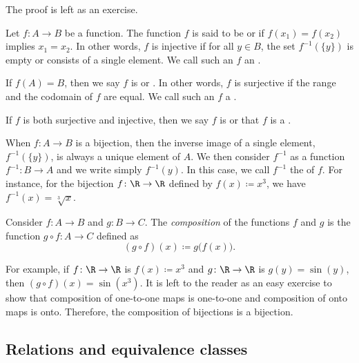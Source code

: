 The proof is left as an exercise.

\begin{defn}
Let $f \colon A \to B$ be a function.
The function $f$ is said to be
\emph{} or
\emph{} if $f(x_1) = f(x_2)$ implies $x_1 = x_2$.  In
other words,
$f$ is injective if
for all $y \in B$, the set
$f^{-1}(\{y\})$ is empty or consists of a single element.
We call such an $f$ an \emph{}.

If $f(A) = B$, then we say $f$ is
\emph{} or
\emph{}.
In other words, $f$ is surjective if the range and the codomain of $f$ are equal.
We call such an $f$ a \emph{}.

If $f$ is both surjective and injective, then
we say $f$ is \emph{} or that $f$ is a
\emph{}.
\end{defn}

When $f \colon A \to B$ is a bijection, then the inverse image of a single
element, $f^{-1}(\{y\})$, is always
a unique element of $A$.  We then consider $f^{-1}$ as a function
$f^{-1} \colon B \to A$ and we write simply $f^{-1}(y)$.
In this case, we call $f^{-1}$ the \emph{} of $f$.
For instance, for the bijection $f \colon \R \to \R$ defined by
$f(x) \coloneqq x^3$, we have
$f^{-1}(x) = \sqrt[3]{x}$.


\begin{defn}
Consider $f \colon A \to B$ and $g \colon B \to C$.  The
\emph{composition}
of the functions $f$ and $g$ is the function
$g \circ f \colon A \to C$ defined as
\begin{equation*}
(g \circ f)(x) \coloneqq g\bigl(f(x)\bigr) .
\end{equation*}
\end{defn}

For example, if $f \colon \R \to \R$ is $f(x)\coloneqq x^3$ and $g \colon \R \to \R$
is $g(y) = \sin(y)$, then $(g \circ f)(x) = \sin(x^3)$.
It is left to the reader as an easy exercise
to show that composition of one-to-one maps is
one-to-one and composition of onto maps is onto.
Therefore, the composition of bijections is a bijection.

\subsection{Relations and equivalence classes}

